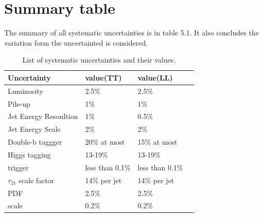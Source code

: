 \clearpage
\section{Summary table}
The summary of all systematic uncertainties is in table 5.1. It also concludes the variation form the uncertainted is considered.
\begin{table}[h!]
  \begin{center}
    \begin{tabular}{l|l|l|l}
    Uncertainty & value(TT) & value(LL) \\
    \hline
    Luminosity &  2.5$\% $ & 2.5$\% $\\
    Pile-up & 1$\% $ & 1$\% $\\
    Jet Energy Resoultion &  1$\% $ & 0.5$\% $\\
    Jet Energy Scale &  2$\% $ & 2$\% $\\
    Double-b taggger &  20$\% $ at most & 15$\% $ at most\\
    Higgs tagging & 13-19$\% $ &13-19$\% $ \\
    trigger &  less than 0.1$\% $ & less than 0.1$\% $\\
    $\tau _{21}$ scale factor &  14$\% $ per jet & 14$\% $ per jet\\
    PDF &  2.5$\% $ & 2.5$\% $\\
    scale &  0.2$\% $ & 0.2$\% $\\
    \hline
    \end{tabular}
  \end{center}

  \caption{List of systematic uncertainties and their values.}
\end{table} 
